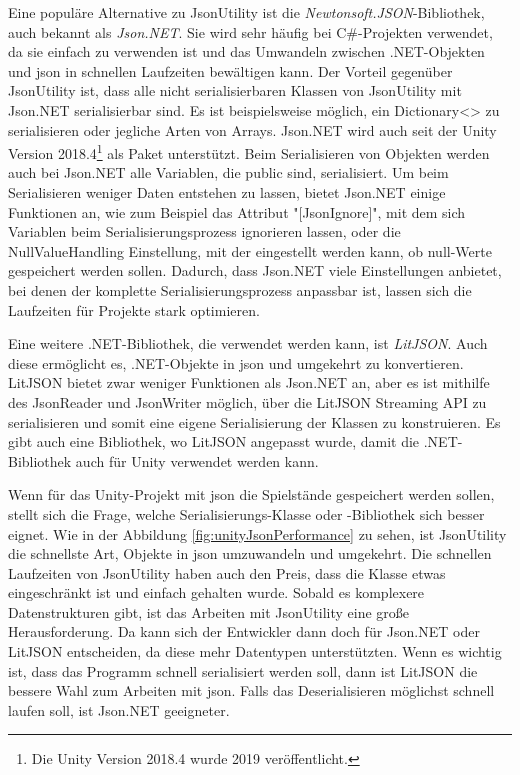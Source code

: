 Eine populäre Alternative zu JsonUtility ist die \textit{Newtonsoft.JSON}-Bibliothek, auch bekannt als \textit{Json.NET}. Sie wird sehr häufig bei C\#-Projekten verwendet, da sie einfach zu verwenden ist und das Umwandeln zwischen .NET-Objekten und \ac{json} in schnellen Laufzeiten bewältigen kann.\cite{newtonsoftJsonNETNewtonsoft} Der Vorteil gegenüber JsonUtility ist, dass alle nicht serialisierbaren Klassen von JsonUtility mit Json.NET serialisierbar sind. Es ist beispielsweise möglich, ein Dictionary<> zu serialisieren\cite{newtonsoftSerializeDictionary}\cite{newtonsoftDeserializeDictionary} oder jegliche Arten von Arrays. Json.NET wird auch seit der Unity Version 2018.4\footnote{Die Unity Version 2018.4 wurde 2019 veröffentlicht.\cite{unityDownloadArchive}} als Paket unterstützt.\cite{NewtonsoftJsonUnitySupport} Beim Serialisieren von Objekten werden auch bei Json.NET alle Variablen, die public sind, serialisiert. Um beim Serialisieren weniger Daten entstehen zu lassen, bietet Json.NET einige Funktionen an, wie zum Beispiel das Attribut "[JsonIgnore]", mit dem sich Variablen beim Serialisierungsprozess ignorieren lassen, oder die NullValueHandling Einstellung, mit der eingestellt werden kann, ob null-Werte gespeichert werden sollen. Dadurch, dass Json.NET viele Einstellungen anbietet, bei denen der komplette Serialisierungsprozess anpassbar ist, lassen sich die Laufzeiten für Projekte stark optimieren.\cite{newtonsoftReducingSerialized}\cite{newtonsoftPerformanceTips}

Eine weitere .NET-Bibliothek, die verwendet werden kann, ist \textit{LitJSON}. Auch diese ermöglicht es, .NET-Objekte in \ac{json} und umgekehrt zu konvertieren.\cite{litjsonLitJSONDocumentation} LitJSON bietet zwar weniger Funktionen als Json.NET an, aber es ist mithilfe des JsonReader und JsonWriter möglich, über die LitJSON Streaming API zu serialisieren und somit eine eigene Serialisierung der Klassen zu konstruieren.\cite{litjsonLitJSONReaders} Es gibt auch eine Bibliothek, wo LitJSON angepasst wurde, damit die .NET-Bibliothek auch für Unity verwendet werden kann.\cite{githubGitHubMervillUnityLitJson}

Wenn für das Unity-Projekt mit \ac{json} die Spielstände gespeichert werden sollen, stellt sich die Frage, welche Serialisierungs-Klasse oder -Bibliothek sich besser eignet. Wie in der Abbildung \ref{fig:unityJsonPerformance} zu sehen, ist JsonUtility die schnellste Art, Objekte in \ac{json} umzuwandeln und umgekehrt. Die schnellen Laufzeiten von JsonUtility haben auch den Preis, dass die Klasse etwas eingeschränkt ist und einfach gehalten wurde. Sobald es komplexere Datenstrukturen gibt, ist das Arbeiten mit JsonUtility eine große Herausforderung. Da kann sich der Entwickler dann doch für Json.NET oder LitJSON entscheiden, da diese mehr Datentypen unterstützten. Wenn es wichtig ist, dass das Programm schnell serialisiert werden soll, dann ist LitJSON die bessere Wahl zum Arbeiten mit \ac{json}. Falls das Deserialisieren möglichst schnell laufen soll, ist Json.NET geeigneter.

